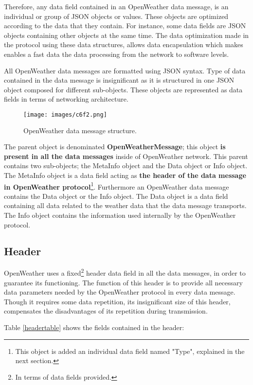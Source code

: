 Therefore, any data field contained in an OpenWeather data message, is an individual or group of \gls{JSON} objects or values. These objects are optimized according to the data that they contain. For instance, some data fields are \gls{JSON} objects containing other objects at the same time. The data optimization made in the protocol using these data structures, allows data encapsulation which makes enables a fast data the data processing from the network to software levels.

All OpenWeather data messages are formatted using \gls{JSON} syntax. Type of data contained in the data message is insignificant as it is structured in one \gls{JSON} object composed for different sub-objects. These objects are represented as data fields in terms of networking architecture. 

\begin{figure}[H]
\centerline{\texttt{[image: images/c6f2.png]}}
\caption{OpenWeather data message structure.}
\end{figure}

The parent object is denominated \textbf{OpenWeatherMessage}; this object \textbf{is present in all the data messages} inside of OpenWeather network. This parent contains two sub-objects; the MetaInfo object and the Data object or Info object. The MetaInfo object is a data field acting as \textbf{the header of the data message in OpenWeather protocol}\footnote{This object is added an individual data field named "Type", explained in the next section.}. Furthermore an OpenWeather data message contains the Data object or the Info object. The Data object is a data field containing all data related to the weather data that the data message transports. The Info object contains the information used internally by the OpenWeather protocol.


\subsection{Header}

OpenWeather uses a fixed\footnote{In terms of data fields provided.} header data field in all the data messages, in order to guarantee its functioning. The function of this header is to provide all necessary data parameters needed by the OpenWeather protocol in every data message. Though it requires some data repetition, its insignificant size of this header, compensates the disadvantages of its repetition during transmission.

Table \ref{headertable} shows the fields contained in the header:

